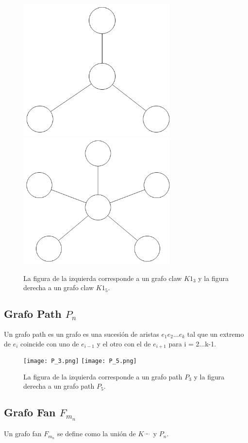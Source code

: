 \begin{figure}[H]
\includegraphics[width=80mm]{K1_3.png}
\includegraphics[width=80mm]{K1_5.png}
\caption{La figura de la izquierda corresponde a un grafo claw $K1_3$ y la figura derecha a un grafo claw $K1_5$.}
\label{overflow}
\end{figure}

\subsection{Grafo Path $P_n$}
Un grafo path es un grafo es una sucesión de aristas $e_1e_2$...$e_k$ tal que un extremo de $e_i$ coincide con uno de $e_{i-1}$ y el otro con el de $e_{i+1}$ para i = 2...k-1.

\begin{figure}[H]
\texttt{[image: P\_3.png]}
\texttt{[image: P\_5.png]}
\caption{La figura de la izquierda corresponde a un grafo path $P_3$ y la figura derecha a un grafo path $P_5$.}
\label{overflow}
\end{figure}

\subsection{Grafo Fan $F_m_n$}
Un grafo fan $F_m_n$ se define como la unión de $K ^ __ (m)$ y $P_n$.

